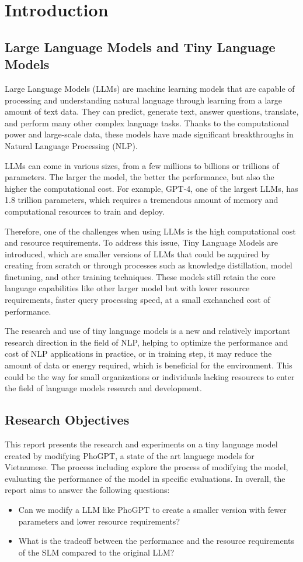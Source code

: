 \chapter{Introduction}

\section{Large Language Models and Tiny Language Models}
Large Language Models (LLMs) are machine learning models that are capable of processing and understanding natural language through learning from a large amount of text data. They can predict, generate text, answer questions, translate, and perform many other complex language tasks. Thanks to the computational power and large-scale data, these models have made significant breakthroughs in Natural Language Processing (NLP). \par 
LLMs can come in various sizes, from a few millions to billions or trillions of parameters. The larger the model, the better the performance, but also the higher the computational cost. For example, GPT-4, one of the largest LLMs, has 1.8 trillion parameters, which requires a tremendous amount of memory and computational resources to train and deploy. \par
Therefore, one of the challenges when using LLMs is the high computational cost and resource requirements. To address this issue, Tiny Language Models are introduced, which are smaller versions of LLMs that could be aqquired by creating from scratch or through processes such as knowledge distillation, model finetuning, and other training techniques. These models still retain the core language capabilities like other larger model but with lower resource requirements, faster query processing speed, at a small exchanched cost of performance. \par
The research and use of tiny language models is a new and relatively important research direction in the field of NLP, helping to optimize the performance and cost of NLP applications in practice, or in training step, it may reduce the amount of data or energy required, which is beneficial for the environment. This could be the way for small organizations or individuals lacking resources to enter the field of language models research and development. \par

\section{Research Objectives}
This report presents the research and experiments on a tiny language model created by modifying PhoGPT, a state of the art languege models for Vietnamese. The process including explore the process of modifying the model, evaluating the performance of the model in specific evaluations. In overall, the report aims to answer the following questions: \par

\begin{itemize}
    \item Can we modify a LLM like PhoGPT to create a smaller version with fewer parameters and lower resource requirements?
    \item What is the tradeoff between the performance and the resource requirements of the SLM compared to the original LLM?
\end{itemize}